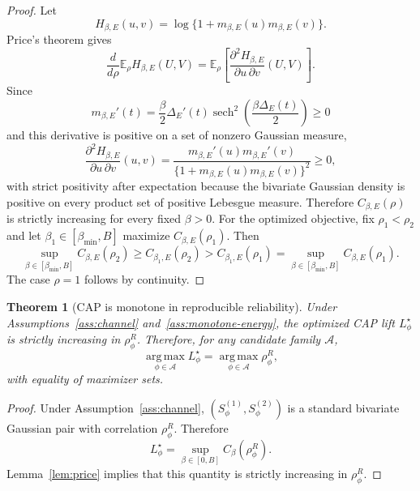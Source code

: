 \documentclass[11pt]{article}
\newtheorem{theorem}{Theorem}
\newcommand{\E}{\mathbb{E}}
\newcommand{\argmax}{\operatorname*{arg\,max}}
\DeclareMathOperator{\sech}{sech}
\begin{document}
\begin{proof}
Let
\[
    H_{\beta,E}(u,v)=\log\{1+m_{\beta,E}(u)m_{\beta,E}(v)\}.
\]
Price's theorem gives
\[
    \frac{d}{d\rho}\E_\rho H_{\beta,E}(U,V)
    =
    \E_\rho\left[\frac{\partial^2 H_{\beta,E}}{\partial u\,\partial v}(U,V)\right].
\]
Since
\[
    m_{\beta,E}'(t)
    =
    \frac{\beta}{2}\Delta_E'(t)
    \sech^2\!\left(\frac{\beta\Delta_E(t)}{2}\right)
    \ge 0
\]
and this derivative is positive on a set of nonzero Gaussian measure,
\[
    \frac{\partial^2 H_{\beta,E}}{\partial u\,\partial v}(u,v)
    =
    \frac{m_{\beta,E}'(u)m_{\beta,E}'(v)}{
        \{1+m_{\beta,E}(u)m_{\beta,E}(v)\}^2
    }
    \ge0,
\]
with strict positivity after expectation because the bivariate Gaussian density
is positive on every product set of positive Lebesgue measure. Therefore
\(C_{\beta,E}(\rho)\) is strictly increasing for every fixed \(\beta>0\).
For the optimized objective, fix \(\rho_1<\rho_2\) and let
\(\beta_1\in[\beta_{\min},B]\) maximize \(C_{\beta,E}(\rho_1)\). Then
\[
    \sup_{\beta\in[\beta_{\min},B]} C_{\beta,E}(\rho_2)
    \ge
    C_{\beta_1,E}(\rho_2)
    >
    C_{\beta_1,E}(\rho_1)
    =
    \sup_{\beta\in[\beta_{\min},B]} C_{\beta,E}(\rho_1).
\]
The case \(\rho=1\) follows by continuity.
\end{proof}

\begin{theorem}[CAP is monotone in reproducible reliability]
\label{thm:score}
Under Assumptions~\ref{ass:channel} and~\ref{ass:monotone-energy}, the
optimized CAP lift \(L_\phi^\star\) is strictly increasing in
\(\rho_\phi^R\). Therefore, for any candidate family \(\mathcal A\),
\[
    \argmax_{\phi\in\mathcal A} L_\phi^\star
    =
    \argmax_{\phi\in\mathcal A} \rho_\phi^R,
\]
with equality of maximizer sets.
\end{theorem}

\begin{proof}
Under Assumption~\ref{ass:channel}, \((S_\phi^{(1)},S_\phi^{(2)})\) is a
standard bivariate Gaussian pair with correlation \(\rho_\phi^R\). Therefore
\[
    L_\phi^\star
    =
    \sup_{\beta\in[0,B]} C_\beta(\rho_\phi^R).
\]
Lemma~\ref{lem:price} implies that this quantity is strictly increasing in
\(\rho_\phi^R\).
\end{proof}
\end{document}
